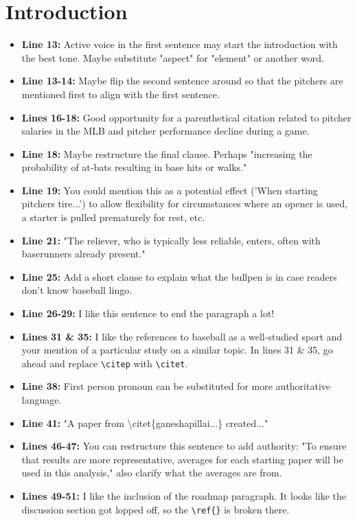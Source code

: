 \documentclass[12pt]{article}
\begin{document}
\section*{Introduction}

\begin{itemize}
    \item \textbf{Line 13:} Active voice in the first sentence may start the introduction with the best tone. Maybe substitute "aspect" for "element" or another word.
    \item \textbf{Line 13-14:} Maybe flip the second sentence around so that the pitchers are mentioned first to align with the first sentence.
    \item \textbf{Lines 16-18:} Good opportunity for a parenthetical citation related to pitcher salaries in the MLB and pitcher performance decline during a game.
    \item \textbf{Line 18:} Maybe restructure the final clause. Perhaps "increasing the probability of at-bats resulting in base hits or walks."
    \item \textbf{Line 19:} You could mention this as a potential effect ('When starting pitchers tire...') to allow flexibility for circumstances where an opener is used, a starter is pulled prematurely for rest, etc.
    \item \textbf{Line 21:} "The reliever, who is typically less reliable, enters, often with baserunners already present."
    \item \textbf{Line 25:} Add a short clause to explain what the bullpen is in case readers don't know baseball lingo.
    \item \textbf{Line 26-29:} I like this sentence to end the paragraph a lot!
    \item \textbf{Lines 31 \& 35:} I like the references to baseball as a well-studied sport and your mention of a particular study on a similar topic. In lines 31 \& 35, go ahead and replace \texttt{\textbackslash citep} with \texttt{\textbackslash citet}.
    \item \textbf{Line 38:} First person pronoun can be substituted for more authoritative language.
    \item \textbf{Line 41:} "A paper from \textbackslash citet\{ganeshapillai...\} created..."
    \item \textbf{Lines 46-47:} You can restructure this sentence to add authority: "To ensure that results are more representative, averages for each starting paper will be used in this analysis," also clarify what the averages are from.
    \item \textbf{Lines 49-51:} I like the inclusion of the roadmap paragraph. It looks like the discussion section got lopped off, so the \texttt{\textbackslash ref\{\}} is broken there.
\end{itemize}
\end{document}
